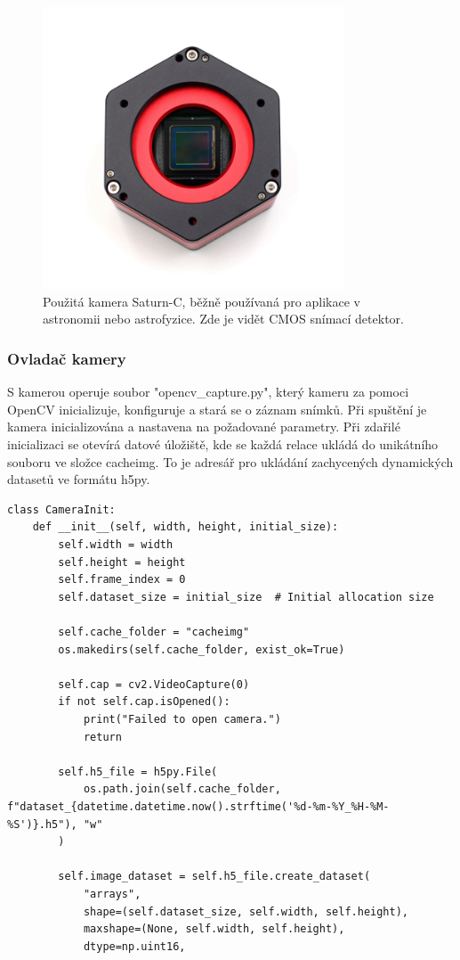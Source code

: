 \documentclass[a4paper,11pt]{article}
\begin{document}
    \begin{figure}[H]
    	\centering
    	\includegraphics[width=0.8\textwidth]{images/saturn.png}
    	\caption{Použitá kamera Saturn-C, běžně používaná pro aplikace v astronomii nebo astrofyzice. Zde je vidět CMOS snímací detektor.}
    \end{figure}
    
\newpage
\subsubsection{Ovladač kamery}
S kamerou operuje soubor "opencv\_capture.py", který kameru za pomoci OpenCV inicializuje, konfiguruje a stará se o záznam snímků. Při spuštění je kamera inicializována a nastavena na požadované parametry. Při zdařilé inicializaci se otevírá datové úložiště, kde se každá relace ukládá do unikátního souboru ve složce cacheimg. To je adresář pro ukládání zachycených dynamických datasetů ve formátu h5py.\\

\begin{lstlisting}
class CameraInit:
    def __init__(self, width, height, initial_size):
        self.width = width
        self.height = height
        self.frame_index = 0
        self.dataset_size = initial_size  # Initial allocation size
        
        self.cache_folder = "cacheimg"
        os.makedirs(self.cache_folder, exist_ok=True)
        
        self.cap = cv2.VideoCapture(0)
        if not self.cap.isOpened():
            print("Failed to open camera.")
            return
        
        self.h5_file = h5py.File(
            os.path.join(self.cache_folder, f"dataset_{datetime.datetime.now().strftime('%d-%m-%Y_%H-%M-%S')}.h5"), "w"
        )

        self.image_dataset = self.h5_file.create_dataset(
            "arrays",
            shape=(self.dataset_size, self.width, self.height),
            maxshape=(None, self.width, self.height),
            dtype=np.uint16,
\end{lstlisting}
\vspace{0.5cm}
\end{document}
